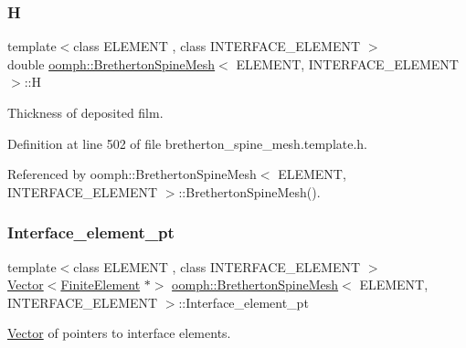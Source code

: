 \subsubsection{\texorpdfstring{H}{H}}
{\footnotesize\ttfamily template$<$class E\+L\+E\+M\+E\+NT , class I\+N\+T\+E\+R\+F\+A\+C\+E\+\_\+\+E\+L\+E\+M\+E\+NT $>$ \\
double \hyperlink{classoomph_1_1BrethertonSpineMesh}{oomph\+::\+Bretherton\+Spine\+Mesh}$<$ E\+L\+E\+M\+E\+NT, I\+N\+T\+E\+R\+F\+A\+C\+E\+\_\+\+E\+L\+E\+M\+E\+NT $>$\+::H\hspace{0.3cm}{\ttfamily [protected]}}



Thickness of deposited film. 



Definition at line 502 of file bretherton\+\_\+spine\+\_\+mesh.\+template.\+h.



Referenced by oomph\+::\+Bretherton\+Spine\+Mesh$<$ E\+L\+E\+M\+E\+N\+T, I\+N\+T\+E\+R\+F\+A\+C\+E\+\_\+\+E\+L\+E\+M\+E\+N\+T $>$\+::\+Bretherton\+Spine\+Mesh().

\mbox{\label{classoomph_1_1BrethertonSpineMesh_a204c551bf8ac1a3a4ca4cd31c0db9c56}} 
\subsubsection{\texorpdfstring{Interface\+\_\+element\+\_\+pt}{Interface\_element\_pt}}
{\footnotesize\ttfamily template$<$class E\+L\+E\+M\+E\+NT , class I\+N\+T\+E\+R\+F\+A\+C\+E\+\_\+\+E\+L\+E\+M\+E\+NT $>$ \\
\hyperlink{classoomph_1_1Vector}{Vector}$<$\hyperlink{classoomph_1_1FiniteElement}{Finite\+Element} $\ast$$>$ \hyperlink{classoomph_1_1BrethertonSpineMesh}{oomph\+::\+Bretherton\+Spine\+Mesh}$<$ E\+L\+E\+M\+E\+NT, I\+N\+T\+E\+R\+F\+A\+C\+E\+\_\+\+E\+L\+E\+M\+E\+NT $>$\+::Interface\+\_\+element\+\_\+pt\hspace{0.3cm}{\ttfamily [protected]}}



\hyperlink{classoomph_1_1Vector}{Vector} of pointers to interface elements. 




